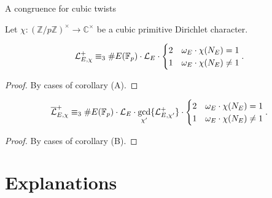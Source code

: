 \documentclass[10pt]{beamer}
\begin{document}
\begin{frame}[t]{A congruence for cubic twists}

Let $ \chi : (\mathbb{Z} / p\mathbb{Z})^\times \to \mathbb{C}^\times $ be a cubic primitive Dirichlet character.

\pause

\begin{corollary}[B]
\vspace{-0.4cm} $$ \vspace{-0.4cm} \mathcal{L}_{E, \chi}^+ \equiv_3 \#E(\mathbb{F}_p) \cdot \mathcal{L}_E \cdot
\begin{cases}
2 & \omega_E \cdot \chi(N_E) = 1 \\
1 & \omega_E \cdot \chi(N_E) \ne 1
\end{cases}.
$$
\end{corollary}

\begin{proof}
By cases of corollary (A).
\end{proof}

\pause

\begin{corollary}[C]
\vspace{-0.4cm} $$ \vspace{-0.4cm} \overline{\mathcal{L}}_{E, \chi}^+ \equiv_3 \#E(\mathbb{F}_p) \cdot \mathcal{L}_E \cdot \gcd_{\chi'}\{\mathcal{L}_{E, \chi'}^+\} \cdot
\begin{cases}
2 & \omega_E \cdot \chi(N_E) = 1 \\
1 & \omega_E \cdot \chi(N_E) \ne 1
\end{cases}.
$$
\end{corollary}

\begin{proof}
By cases of corollary (B).
\end{proof}

\end{frame}

\section{Explanations}
\end{document}
